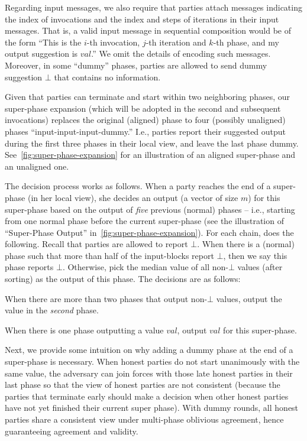 Regarding input messages, we also require that parties attach messages indicating the index of invocations and the index and steps of iterations in their input messages.
%
That is, a valid input message in sequential composition would be of the form ``This is the $i$-th invocation, $j$-th iteration and $k$-th phase, and my output suggestion is $val$.''
%
We omit the details of encoding such messages.
%
Moreover, in some ``dummy'' phases, parties are allowed to send dummy suggestion $\bot$ that contains no information.

Given that parties can terminate and start within two neighboring phases, our super-phase expansion (which will be adopted in the second and subsequent invocations) replaces the original (aligned) phase to four (possibly unaligned) phases ``input-input-input-dummy.''
%
I.e., parties report their suggested output during the first three phases in their local view, and leave the last phase dummy.
%
See~\cref{fig:super-phase-expansion} for an illustration of an aligned super-phase and an unaligned one.



The decision process works as follows.
%
When a party \party reaches the end of a super-phase (in her local view), she decides an output (a vector of size $m$) for this super-phase based on the output of \emph{five} previous (normal) phases -- i.e., starting from one normal phase before the current super-phase (see the illustration of ``Super-Phase Output'' in~\cref{fig:super-phase-expansion}).
%
For each chain, \party does the following.
%
Recall that parties are allowed to report $\bot$.
%
When there is a (normal) phase such that more than half of the input-blocks report $\bot$, then we say this phase reports $\bot$.
%
Otherwise, pick the median value of all non-$\bot$ values (after sorting) as the output of this phase. The decisions are as follows:
%
\begin{cccItemize}[noitemsep]
    \item When there are more than two phases that output non-$\bot$ values, output the value in the \emph{second} phase.
    
    \item When there is one phase outputting a value $val$, output $val$ for this super-phase.
\end{cccItemize}

Next, we provide some intuition on why adding a dummy phase at the end of a super-phase is necessary.
%
When honest parties do not start unanimously with the same value, the adversary can join forces with those late honest parties in their last phase so that the view of honest parties are not consistent (because the parties that terminate early should make a decision when other honest parties have not yet finished their current super phase).
%
With dummy rounds, all honest parties share a consistent view under multi-phase oblivious agreement, hence guaranteeing agreement and validity.

